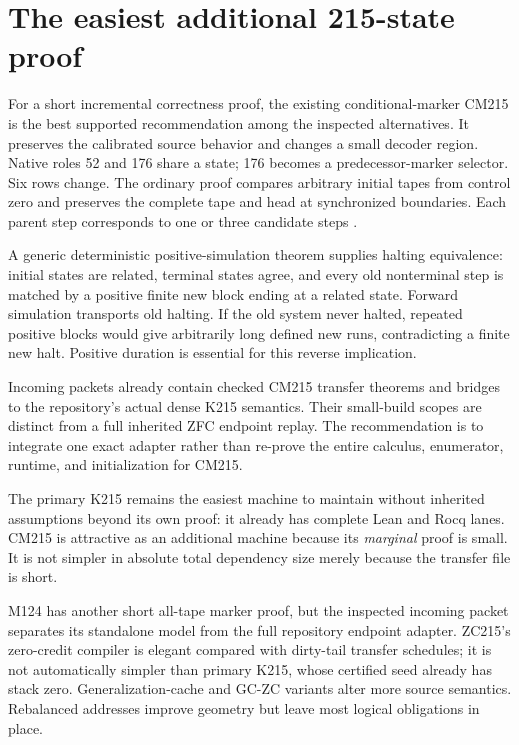 \documentclass[11pt]{article}
\begin{document}
\section{The easiest additional 215-state proof}

For a short incremental correctness proof, the existing conditional-marker CM215 is the best supported recommendation among the inspected alternatives. It preserves the calibrated source behavior and changes a small decoder region. Native roles 52 and 176 share a state; 176 becomes a predecessor-marker selector. Six rows change. The ordinary proof compares arbitrary initial tapes from control zero and preserves the complete tape and head at synchronized boundaries. Each parent step corresponds to one or three candidate steps \cite{cm215}.

A generic deterministic positive-simulation theorem supplies halting equivalence: initial states are related, terminal states agree, and every old nonterminal step is matched by a positive finite new block ending at a related state. Forward simulation transports old halting. If the old system never halted, repeated positive blocks would give arbitrarily long defined new runs, contradicting a finite new halt. Positive duration is essential for this reverse implication.

Incoming packets already contain checked CM215 transfer theorems and bridges to the repository's actual dense K215 semantics. Their small-build scopes are distinct from a full inherited ZFC endpoint replay. The recommendation is to integrate one exact adapter rather than re-prove the entire calculus, enumerator, runtime, and initialization for CM215.

The primary K215 remains the easiest machine to maintain without inherited assumptions beyond its own proof: it already has complete Lean and Rocq lanes. CM215 is attractive as an additional machine because its \emph{marginal} proof is small. It is not simpler in absolute total dependency size merely because the transfer file is short.

M124 has another short all-tape marker proof, but the inspected incoming packet separates its standalone model from the full repository endpoint adapter. ZC215's zero-credit compiler is elegant compared with dirty-tail transfer schedules; it is not automatically simpler than primary K215, whose certified seed already has stack zero. Generalization-cache and GC-ZC variants alter more source semantics. Rebalanced addresses improve geometry but leave most logical obligations in place.
\end{document}
